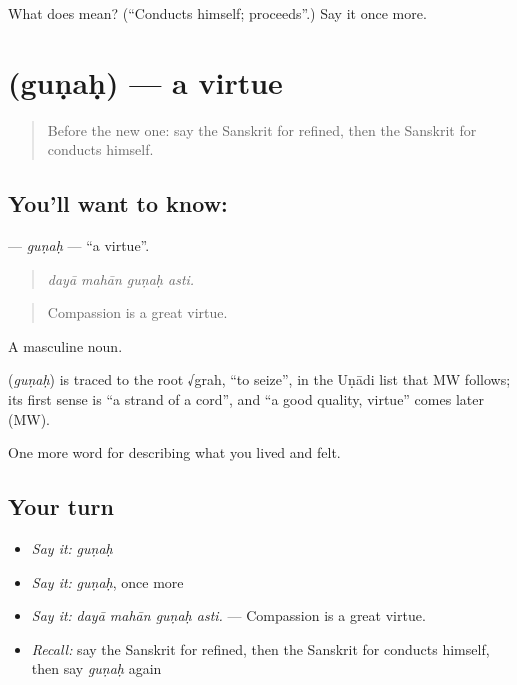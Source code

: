 \begin{tcolorbox}[breakable,colback=teal!4,colframe=teal!35!black,title={Before you move on}]
What does  mean? (\textquotedblleft{}Conducts himself; proceeds\textquotedblright{}.) Say it once more.
\end{tcolorbox}
\section[\texorpdfstring{\sk{गुणः} (guṇaḥ)}{गुणः (guṇaḥ)}]{ (guṇaḥ) — a virtue}

\label{lesson:SA-C460-gunah}



\begin{quote}
Before the new one: say the Sanskrit for refined, then the Sanskrit for conducts himself.
\end{quote}

\subsection*{You'll want to know: }
\textbf{} — \emph{guṇaḥ} — \textquotedblleft{}a virtue\textquotedblright{}.

\begin{quote}
   
\end{quote}

\begin{quote}
\emph{dayā mahān guṇaḥ asti.}
\end{quote}

\begin{quote}
Compassion is a great virtue.
\end{quote}

A masculine noun.

\begin{cousinweb}
\textbf{} (\emph{guṇaḥ}) is traced to the root √grah, \textquotedblleft{}to seize\textquotedblright{}, in the Uṇādi list that MW follows; its first sense is \textquotedblleft{}a strand of a cord\textquotedblright{}, and \textquotedblleft{}a good quality, virtue\textquotedblright{} comes later (MW).
\end{cousinweb}

\begin{grammarlens}[title={What you've built}]
One more word for describing what you lived and felt.
\end{grammarlens}

\subsection*{Your turn}
\begin{itemize}
\raggedright
  \item \emph{Say it:} \emph{guṇaḥ}
  \item \emph{Say it:} \emph{guṇaḥ}, once more
  \item \emph{Say it:} \emph{dayā mahān guṇaḥ asti.} — Compassion is a great virtue.
  \item \emph{Recall:} say the Sanskrit for refined, then the Sanskrit for conducts himself, then say \emph{guṇaḥ} again
\end{itemize}

